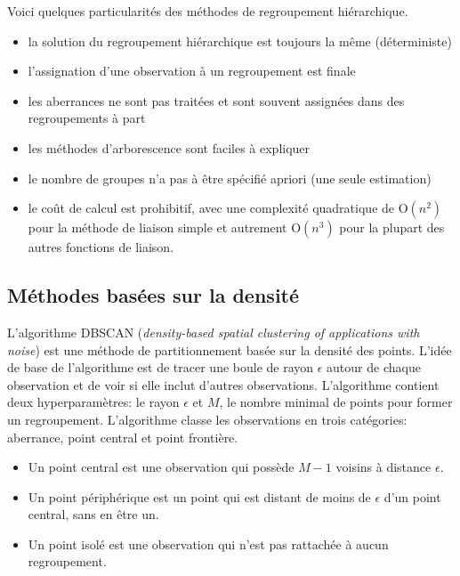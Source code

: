 \documentclass[
  11pt,
  letterpaper,
]{scrbook}
\providecommand{\tightlist}{%
  \setlength{\itemsep}{0pt}\setlength{\parskip}{0pt}}\usepackage{longtable,booktabs,array}
\theoremstyle{definition}
\theoremstyle{remark}
\begin{document}
Voici quelques particularités des méthodes de regroupement hiérarchique.

\begin{itemize}
\tightlist
\item
  la solution du regroupement hiérarchique est toujours la même
  (déterministe)
\item
  l'assignation d'une observation à un regroupement est finale
\item
  les aberrances ne sont pas traitées et sont souvent assignées dans des
  regroupements à part
\item
  les méthodes d'arborescence sont faciles à expliquer
\item
  le nombre de groupes n'a pas à être spécifié apriori (une seule
  estimation)
\item
  le coût de calcul est prohibitif, avec une complexité quadratique de
  \(\mathrm{O}(n^2)\) pour la méthode de liaison simple et autrement
  \(\mathrm{O}(n^3)\) pour la plupart des autres fonctions de liaison.
\end{itemize}

\hypertarget{muxe9thodes-basuxe9es-sur-la-densituxe9}{%
\subsection{Méthodes basées sur la
densité}\label{muxe9thodes-basuxe9es-sur-la-densituxe9}}

L'algorithme DBSCAN (\emph{density-based spatial clustering of
applications with noise}) est une méthode de partitionnement basée sur
la densité des points. L'idée de base de l'algorithme est de tracer une
boule de rayon \(\epsilon\) autour de chaque observation et de voir si
elle inclut d'autres observations. L'algorithme contient deux
hyperparamètres: le rayon \(\epsilon\) et \(M\), le nombre minimal de
points pour former un regroupement. L'algorithme classe les observations
en trois catégories: aberrance, point central et point frontière.

\begin{itemize}
\tightlist
\item
  Un point central est une observation qui possède \(M-1\) voisins à
  distance \(\epsilon\).
\item
  Un point périphérique est un point qui est distant de moins de
  \(\epsilon\) d'un point central, sans en être un.
\item
  Un point isolé est une observation qui n'est pas rattachée à aucun
  regroupement.
\end{itemize}
\end{document}
